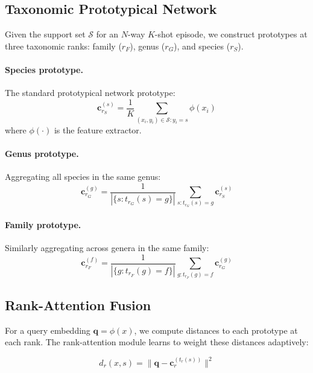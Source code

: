 \documentclass[11pt,a4paper]{article}
\newcommand{\Support}{\mathcal{S}}
\begin{document}
\subsection{Taxonomic Prototypical Network}

Given the support set $\Support$ for an $N$-way $K$-shot episode, we
construct prototypes at three taxonomic ranks: family ($r_F$), genus
($r_G$), and species ($r_S$).

\paragraph{Species prototype.} The standard prototypical network
prototype:
\begin{equation}
  \mathbf{c}_{r_S}^{(s)} = \frac{1}{K} \sum_{(x_i, y_i) \in
  \Support : y_i = s} \phi(x_i)
  \label{eq:species_proto}
\end{equation}
where $\phi(\cdot)$ is the feature extractor.

\paragraph{Genus prototype.} Aggregating all species in the same genus:
\begin{equation}
  \mathbf{c}_{r_G}^{(g)} = \frac{1}{|\{s : t_{r_G}(s) = g\}|}
  \sum_{s : t_{r_G}(s) = g} \mathbf{c}_{r_S}^{(s)}
\end{equation}

\paragraph{Family prototype.} Similarly aggregating across genera in
the same family:
\begin{equation}
  \mathbf{c}_{r_F}^{(f)} = \frac{1}{|\{g : t_{r_F}(g) = f\}|}
  \sum_{g : t_{r_F}(g) = f} \mathbf{c}_{r_G}^{(g)}
\end{equation}

\subsection{Rank-Attention Fusion}

For a query embedding $\mathbf{q} = \phi(x)$, we compute distances to
each prototype at each rank. The rank-attention module learns to weight
these distances adaptively:

\begin{equation}
  d_r(x, s) = \|\mathbf{q} - \mathbf{c}_r^{(t_r(s))}\|^2
\end{equation}
\end{document}
